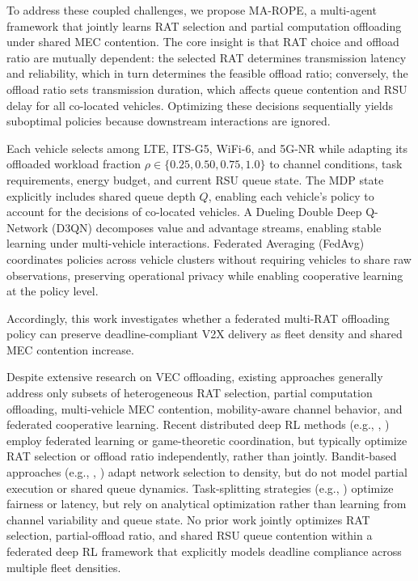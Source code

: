 \documentclass[journal,10pt,twocolumn]{IEEEtran}
\begin{document}
To address these coupled challenges, we propose MA-ROPE, a multi-agent framework that jointly learns RAT selection and partial computation offloading under shared MEC contention. The core insight is that RAT choice and offload ratio are mutually dependent: the selected RAT determines transmission latency and reliability, which in turn determines the feasible offload ratio; conversely, the offload ratio sets transmission duration, which affects queue contention and RSU delay for all co-located vehicles. Optimizing these decisions sequentially yields suboptimal policies because downstream interactions are ignored.

Each vehicle selects among LTE, ITS-G5, WiFi-6, and 5G-NR while adapting its offloaded workload fraction $\rho \in \{0.25, 0.50, 0.75, 1.0\}$ to channel conditions, task requirements, energy budget, and current RSU queue state. The MDP state explicitly includes shared queue depth $Q$, enabling each vehicle's policy to account for the decisions of co-located vehicles. A Dueling Double Deep Q-Network (D3QN) decomposes value and advantage streams, enabling stable learning under multi-vehicle interactions. Federated Averaging (FedAvg) coordinates policies across vehicle clusters without requiring vehicles to share raw observations, preserving operational privacy while enabling cooperative learning at the policy level.

Accordingly, this work investigates whether a federated multi-RAT offloading policy can preserve deadline-compliant V2X delivery as fleet density and shared MEC contention increase.

Despite extensive research on VEC offloading, existing approaches generally address only subsets of heterogeneous RAT selection, partial computation offloading, multi-vehicle MEC contention, mobility-aware channel behavior, and federated cooperative learning. Recent distributed deep RL methods (e.g., \cite{zhao2024}, \cite{guo2026}) employ federated learning or game-theoretic coordination, but typically optimize RAT selection or offload ratio independently, rather than jointly. Bandit-based approaches (e.g., \cite{wu2021}, \cite{haq2026}) adapt network selection to density, but do not model partial execution or shared queue dynamics. Task-splitting strategies (e.g., \cite{jing2019}) optimize fairness or latency, but rely on analytical optimization rather than learning from channel variability and queue state. No prior work jointly optimizes RAT selection, partial-offload ratio, and shared RSU queue contention within a federated deep RL framework that explicitly models deadline compliance across multiple fleet densities.
\end{document}
